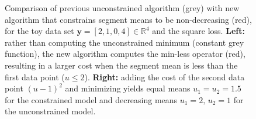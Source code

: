 \documentclass{article}
\newtheorem{definition}{Definition}
\newcommand{\RR}{\mathbb R}
\begin{document}
\begin{figure}
  \centering
  
  
  \vskip -0.5cm
  \caption{Comparison of previous unconstrained algorithm (grey) with
    new algorithm that constrains segment means to be non-decreasing (red),
    for the toy data set $\mathbf y= [ 2, 1, 0, 4 ] \in\RR^4$ and the
    square loss. \textbf{Left:} rather than computing the
    unconstrained minimum (constant grey function), the new algorithm
    computes the min-less operator (red), resulting in a larger cost
    when the segment mean is less than the first data point
    ($u\leq 2$). \textbf{Right:} adding the cost of the second data
    point $(u-1)^2$ and minimizing yields equal means
    $u_1=u_2=1.5$ for the constrained model and decreasing 
    means $u_1=2,\, u_2=1$ for the unconstrained model.}
  \label{fig:compare-unconstrained}
\end{figure}

\end{document}
